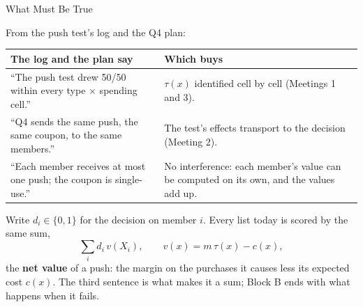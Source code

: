 \documentclass[aspectratio=169, 11pt, handout]{beamer}
\begin{document}
\begin{frame}{What Must Be True}

From the push test's log and the Q4 plan:

\begin{center}
\small
\begin{tabular}{p{6.4cm}p{6.6cm}}
\toprule
\textbf{The log and the plan say} & \textbf{Which buys} \\
\midrule
``The push test drew 50/50 within every type $\times$ spending cell.'' & $\tau(x)$ identified cell by cell (Meetings 1 and 3). \\[0.4em]
``Q4 sends the same push, the same \textyen 5 coupon, to the same members.'' & The test's effects transport to the decision (Meeting 2). \\[0.4em]
``Each member receives at most one push; the coupon is single-use.'' & No interference: each member's value can be computed on its own, and the values add up. \\
\bottomrule
\end{tabular}
\end{center}

\bigskip

Write $d_i \in \{0,1\}$ for the decision on member $i$. Every list today is scored by the same sum,
\[
\sum_i d_i\, v(X_i), \qquad v(x) = m\,\tau(x) - c(x),
\]
the \textbf{net value} of a push: the margin on the purchases it causes less its expected cost $c(x)$. The third sentence is what makes it a sum; Block B ends with what happens when it fails.
\end{frame}
\end{document}
